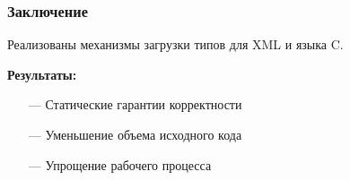 \documentclass[12pt]{beamer}
\begin{document}
\begin{frame}\frametitle{Заключение}
Реализованы механизмы загрузки типов для XML и языка C.

\textbf{Результаты:}
    \begin{itemize}
        \item[---] Статические гарантии корректности
        \item[---] Уменьшение объема исходного кода
        \item[---] Упрощение рабочего процесса
    \end{itemize}
\end{frame}
\end{document}
